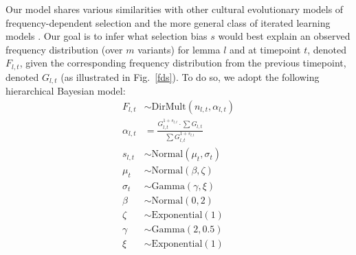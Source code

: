 \documentclass[doc,biblatex]{apa7}
\begin{document}
Our model shares various similarities with other cultural evolutionary models of frequency-dependent selection \parencite[e.g.,][]{Pagel:2019, Newberry:2022, GuerreroMontero:2023} and the more general class of iterated learning models \parencite[e.g.,][]{Griffiths:2007, KirbyDowmanGriffiths:2007, Reali:2009}. Our goal is to infer what selection bias $s$ would best explain an observed frequency distribution (over $m$ variants) for lemma $l$ and at timepoint $t$, denoted $F_{l,t}$, given the corresponding frequency distribution from the previous timepoint, denoted $G_{l,t}$ (as illustrated in Fig.~\ref{fds}). To do so, we adopt the following hierarchical Bayesian model:
\begin{align*}
            F_{l,t} & \sim \mathrm{DirMult}(n_{l,t}, \alpha_{l,t}) \\
       \alpha_{l,t} & = \frac{G_{l,t}^{1 + s_{l,t}} \cdot \sum G_{l,t}}{\sum G_{l,t}^{1 + s_{l,t}}} \\
            s_{l,t} & \sim \mathrm{Normal}(\mu_t, \sigma_t) \\
              \mu_t & \sim \mathrm{Normal}(\beta, \zeta) \\
           \sigma_t & \sim \mathrm{Gamma}(\gamma, \xi) \\
              \beta & \sim \mathrm{Normal}(0, 2) \\
              \zeta & \sim \mathrm{Exponential}(1) \\
             \gamma & \sim \mathrm{Gamma}(2, 0.5) \\
                \xi & \sim \mathrm{Exponential}(1)
\end{align*}
\end{document}
